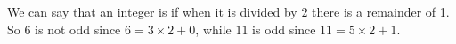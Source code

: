 We can say that an integer is  if when it is divided by $2$ there is a remainder of 1.  So $6$ is not odd since $6=3\times 2+0$, while $11$ is odd since $11=5\times 2 + 1$.